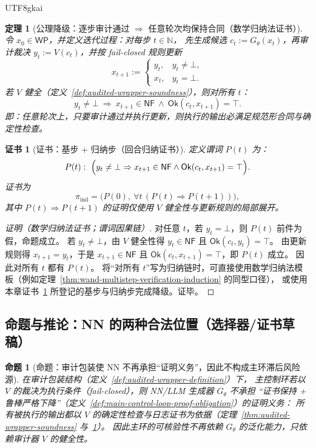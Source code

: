 \documentclass[12pt]{article}
\newtheorem{theorem}{定理}[section]
\newtheorem{proposition}{命题}[section]
\newtheorem{Certificate}{证书}[section]
\newcommand{\NN}{\mathbb{N}}
\begin{document}
\begin{CJK*}{UTF8}{gkai}
\begin{theorem}[公理降级：逐步审计通过 $\Rightarrow$ 任意轮次均保持合同（数学归纳法证书）]
\label{thm:audited-wrapper-inductive-safety}
令 $x_0\in\mathsf{WP}$，并定义迭代过程：对每步 $t\in\NN$，
先生成候选 $c_t:=G_\theta(x_t)$，再审计裁决 $y_t:=V(c_t)$，并按 fail-closed 规则更新
\[
  x_{t+1}:=
  \begin{cases}
    y_t, & y_t\neq\bot,\\
    x_t, & y_t=\bot.
  \end{cases}
\]
若 $V$ 健全（定义~\ref{def:audited-wrapper-soundness}），则对所有 $t$：
\[
  y_t\neq\bot\ \Longrightarrow\ x_{t+1}\in\mathsf{NF}\ \wedge\ \mathsf{Ok}(c_t,x_{t+1})=\top.
\]
即：任意轮次上，只要审计通过并执行更新，则执行的输出必满足规范形合同与确定性检查。
\end{theorem}

\begin{Certificate}[证书：基步 + 归纳步（回合归纳证书）]
\label{cert:audited-wrapper-inductive-safety}
定义谓词 $P(t)$ 为：
\[
  P(t):\ \Bigl(y_t\neq\bot\Rightarrow x_{t+1}\in\mathsf{NF}\wedge \mathsf{Ok}(c_t,x_{t+1})=\top\Bigr).
\]
证书为
\[
  \pi_{\mathrm{ind}}=\bigl(P(0),\ \forall t\,(P(t)\Rightarrow P(t+1))\bigr),
\]
其中 $P(t)\Rightarrow P(t+1)$ 的证明仅使用 $V$ 健全性与更新规则的局部展开。
\end{Certificate}

\begin{proof}[证明（数学归纳法证书；谓词因果链）]
对任意 $t$，若 $y_t=\bot$，则 $P(t)$ 前件为假，命题成立。
若 $y_t\neq\bot$，由 $V$ 健全性得 $y_t\in\mathsf{NF}$ 且 $\mathsf{Ok}(c_t,y_t)=\top$。
由更新规则得 $x_{t+1}=y_t$，于是 $x_{t+1}\in\mathsf{NF}$ 且 $\mathsf{Ok}(c_t,x_{t+1})=\top$，即 $P(t)$ 成立。
因此对所有 $t$ 都有 $P(t)$。
将“对所有 $t$”写为归纳链时，可直接使用数学归纳法模板（例如定理~\ref{thm:wand-multistep-verification-induction} 的同型口径），
或使用本章证书~\ref{cert:audited-wrapper-inductive-safety} 所登记的基步与归纳步完成降级。证毕。
\end{proof}

\subsection{命题与推论：NN 的两种合法位置（选择器/证书草稿）}
\label{sec:audited-wrapper-uses}

\begin{proposition}[命题：审计包装使 NN 不再承担“证明义务”，因此不构成主环滞后风险源]
\label{prop:audited-wrapper-removes-proof-burden}
在审计包装结构（定义~\ref{def:audited-wrapper-definition}）下，
主控制环若以 $V$ 的裁决为执行条件（fail-closed），则 NN/LLM 生成器 $G_\theta$ 不承担
“证书保持 + 鲁棒严格下降”（定义~\ref{def:main-control-loop-proof-obligation}）的证明义务：
所有被执行的输出都以 $V$ 的确定性检查与日志证书为依据（定理~\ref{thm:audited-wrapper-soundness} 与~\ref{thm:audited-wrapper-inductive-safety}）。
因此主环的可核验性不再依赖 $G_\theta$ 的泛化能力，只依赖审计器 $V$ 的健全性。
\end{proposition}


\end{CJK*}
\end{document}
